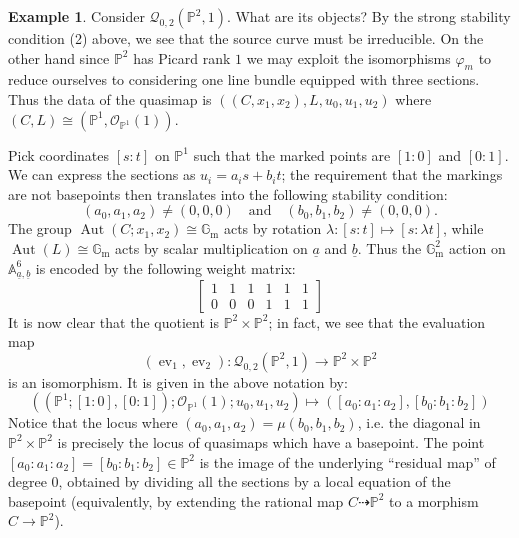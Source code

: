 \documentclass[11pt]{amsart}
\newcommand{\Q}[4]{\mathcal{Q}_{#1,#2}(#3,#4)}
\newcommand{\PP}{\mathbb P}
\newcommand{\OO}{\mathcal{O}}
\renewcommand{\to}{\rightarrow}
\newcommand{\Gm}{\mathbb{G}_{\text{m}}}
\newcommand{\ev}{\operatorname{ev}}
\newcommand{\Aut}{\operatorname{Aut}}
\theoremstyle{definition}
\theoremstyle{definition}
\newtheorem{example}[thm]{Example}
\begin{document}
\begin{example} Consider $\Q{0}{2}{\PP^2}{1}$. What are its objects? By the strong stability condition (2) above, we see that the source curve must be irreducible. On the other hand since $\PP^2$ has Picard rank $1$ we may exploit the isomorphisms $\varphi_m$ to reduce ourselves to considering one line bundle equipped with three sections. Thus the data of the quasimap is $((C,x_1,x_2),L,u_0,u_1,u_2)$ where $(C,L)\cong(\PP^1,\OO_{\PP^1}(1))$.

Pick coordinates $[s:t]$ on $\PP^1$ such that the marked points are $[1:0]$ and $[0:1]$. We can express the sections as $u_i=a_is+b_it$; the requirement that the markings are not basepoints then translates into the following stability condition:
 \[
  (a_0,a_1,a_2)\neq(0,0,0)\quad \text{and}\quad (b_0,b_1,b_2)\neq(0,0,0).
 \]
The group $\Aut(C;x_1,x_2)\cong\Gm$ acts by rotation $\lambda\colon[s:t]\mapsto[s:\lambda t]$, while $\Aut(L)\cong\Gm$ acts by scalar multiplication on $\underline{a}$ and $\underline{b}$. Thus the $\Gm^2$ action on $\mathbb A^6_{\underline{a} ,\underline{b}}$ is encoded by the following weight matrix:
\[ \left[ \begin{array}{cccccc}
1 & 1 & 1 & 1 & 1 & 1 \\
0 & 0 & 0 & 1 & 1 & 1 \end{array} \right]\] 
It is now clear that the quotient is $\PP^2\times\PP^2$; in fact, we see that the evaluation map
\[
 (\ev_1,\ev_2)\colon\Q{0}{2}{\PP^2}{1}\to\PP^2\times\PP^2
\]
is an isomorphism. It is given in the above notation by:
\begin{equation*} ((\PP^1;[1:0],[0:1]); \OO_{\PP^1}(1); u_0, u_1, u_2) \mapsto ([a_0 : a_1 : a_2],[b_0 : b_1 : b_2]) \end{equation*}
Notice that the locus where $(a_0,a_1,a_2)=\mu(b_0,b_1,b_2)$, i.e. the diagonal in $\PP^2 \times \PP^2$ is precisely the locus of quasimaps which have a basepoint. The point $[a_0:a_1:a_2]=[b_0:b_1:b_2]\in\PP^2$ is the image of the underlying ``residual map'' of degree 0, obtained by dividing all the sections by a local equation of the basepoint (equivalently, by extending the rational map $C\dashrightarrow \PP^2$ to a morphism $C \to \PP^2$).


\end{example}
\end{document}
